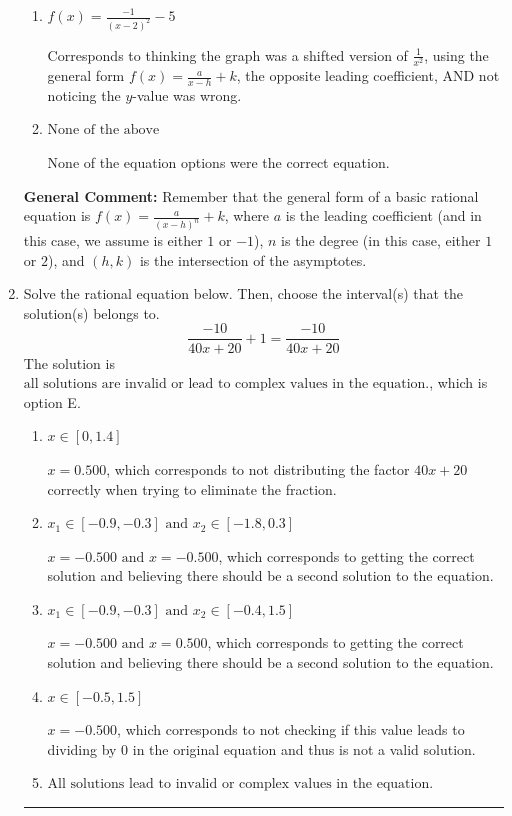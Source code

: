 \documentclass{extbook}[14pt]
\newcommand{\litem}[1]{\item #1

\rule{\textwidth}{0.4pt}}
\begin{document}
\begin{enumerate}
{\begin{enumerate}[label=\Alph*.]
Corresponds to thinking the graph was a shifted version of $\frac{1}{x^2}$ not noticing the $y$-value was wrong.
\item \( f(x) = \frac{-1}{(x - 2)^2} - 5 \)

Corresponds to thinking the graph was a shifted version of $\frac{1}{x^2}$, using the general form $f(x) = \frac{a}{x-h}+k$, the opposite leading coefficient, AND not noticing the $y$-value was wrong.
\item \( \text{None of the above} \)

None of the equation options were the correct equation.
\end{enumerate}

\textbf{General Comment:} Remember that the general form of a basic rational equation is $ f(x) = \frac{a}{(x-h)^n} + k$, where $a$ is the leading coefficient (and in this case, we assume is either $1$ or $-1$), $n$ is the degree (in this case, either $1$ or $2$), and $(h, k)$ is the intersection of the asymptotes.
}
\litem{
Solve the rational equation below. Then, choose the interval(s) that the solution(s) belongs to.
\[ \frac{-10}{40x + 20} + 1 = \frac{-10}{40x + 20} \]The solution is \( \text{all solutions are invalid or lead to complex values in the equation.} \), which is option E.\begin{enumerate}[label=\Alph*.]
\item \( x \in [0,1.4] \)

$x = 0.500$, which corresponds to not distributing the factor $40x + 20$ correctly when trying to eliminate the fraction.
\item \( x_1 \in [-0.9, -0.3] \text{ and } x_2 \in [-1.8,0.3] \)

$x = -0.500 \text{ and } x = -0.500$, which corresponds to getting the correct solution and believing there should be a second solution to the equation.
\item \( x_1 \in [-0.9, -0.3] \text{ and } x_2 \in [-0.4,1.5] \)

$x = -0.500 \text{ and } x = 0.500$, which corresponds to getting the correct solution and believing there should be a second solution to the equation.
\item \( x \in [-0.5,1.5] \)

$x = -0.500$, which corresponds to not checking if this value leads to dividing by 0 in the original equation and thus is not a valid solution.
\item \( \text{All solutions lead to invalid or complex values in the equation.} \)


\end{enumerate}}
\end{enumerate}
\end{document}
